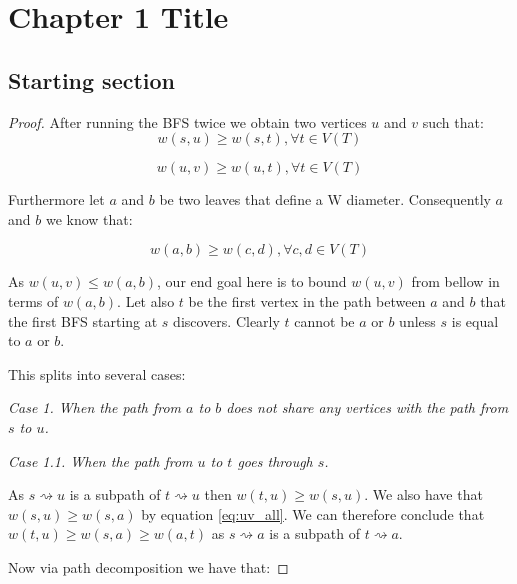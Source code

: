 \chapter{Chapter 1 Title}
\label{chapter1}

\section{Starting section}

\newtheorem{w-algorithm}{The W Detection Algorithm is Correct.}

\begin{proof}
After running the BFS twice we obtain two vertices $u$ and $v$ such that:
\begin{equation}
    \label{eq:su_all}
    w(s, u) \ge w(s, t), \forall t \in V(T)
\end{equation}

\begin{equation}
    \label{eq:uv_all}
    w(u, v) \ge w(u, t), \forall t \in V(T)
\end{equation}

Furthermore let $a$ and $b$ be two leaves that define a W diameter. Consequently $a$ and $b$ we know that:

\begin{equation}
    \label{eq:ab_all}
    w(a, b) \ge w(c, d), \forall c, d \in V(T)
\end{equation}

As $w(u, v) \le w(a, b)$, our end goal here is to bound $w(u, v)$ from bellow in terms of $w(a, b)$. Let also $t$ be the first vertex in the path between $a$ and $b$ that the first BFS starting at $s$ discovers. Clearly $t$ cannot be $a$ or $b$ unless $s$ is equal to $a$ or $b$.

This splits into several cases: \linebreak

{\em Case 1. When the path from $a$ to $b$ does not share any vertices with the path from $s$ to $u$.}

{\em Case 1.1. When the path from $u$ to $t$ goes through $s$.}

As $s \rightsquigarrow u$ is a subpath of $t \rightsquigarrow u$ then $w(t, u) \ge w(s, u)$. We also have that $w(s, u) \ge w(s, a)$ by equation \ref{eq:uv_all}. We can therefore conclude that $w(t, u) \ge w(s, a) \ge w(a, t)$ as $s \rightsquigarrow a$ is a subpath of $t \rightsquigarrow a$.

Now via path decomposition we have that:


\end{proof}
